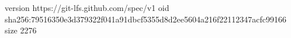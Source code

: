 version https://git-lfs.github.com/spec/v1
oid sha256:79516350e3d379322f041a91dbcf5355d8d2ee5604a216f22112347acfc99166
size 2276
